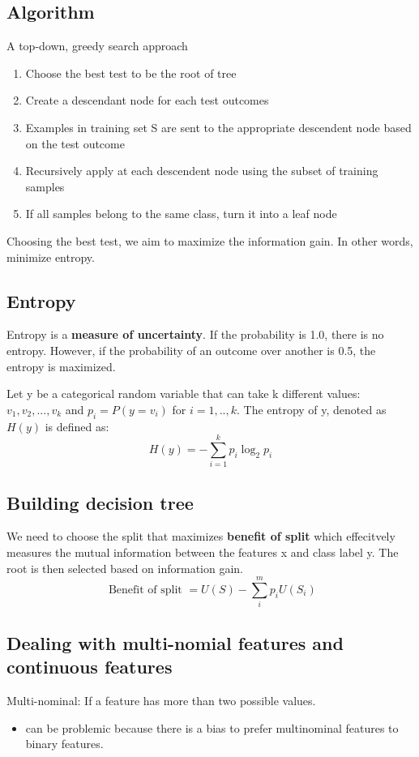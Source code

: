 \documentclass[11pt]{article}
\begin{document}
\subsection{Algorithm}
\label{sec:org8c12aaa}
A top-down, greedy search approach
\begin{enumerate}
\item Choose the best test to be the root of tree
\item Create a descendant node for each test outcomes
\item Examples in training set S are sent to the appropriate descendent node based on the test outcome
\item Recursively apply at each descendent node using the subset of training samples
\item If all samples belong to the same class, turn it into a leaf node
\end{enumerate}

Choosing the best test, we aim to maximize the information gain. In other words, minimize entropy.

\subsection{Entropy}
\label{sec:orgce72234}
Entropy is a \textbf{\textbf{measure of uncertainty}}. If the probability is 1.0, there is no entropy. However, if the probability of an outcome over another is 0.5, the entropy is maximized.

Let y be a categorical random variable that can take k different values: \(v_1, v_2,...,v_k\) and \(p_i=P(y=v_i)\)  for \(i=1,..,k\). The entropy of y, denoted as \(H(y)\) is defined as: 
$$
H ( y ) = - \sum _ { i = 1} ^ { k } p _ { i } \log _ { 2} p _ { i }
$$
\subsection{Building decision tree}
\label{sec:orge6598d3}
We need to choose the split that maximizes \textbf{\textbf{benefit of split}} which effecitvely measures the mutual information between the features x and class label y. The root is then selected based on information gain.  
$$
\text{ Benefit of split } = U ( S ) - \sum _ { i } ^ { m } p _ { i } U \left( S _ { i } \right)
$$
\subsection{Dealing with multi-nomial features  and continuous features}
\label{sec:org0811ffd}
Multi-nominal: If a feature has more than two possible values. 
\begin{itemize}
\item can be problemic because there is a bias to prefer multinominal features to binary features.
\end{itemize}
\end{document}

